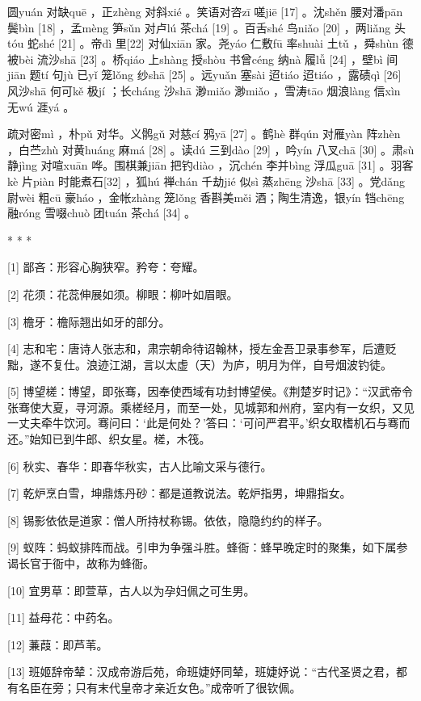 \documentclass[12pt,UTF8]{ctexbook}
\begin{document}
圆yuán 对缺quē ，正zhèng 对斜xié 。笑语对咨zī 嗟jiē [17] 。沈shěn 腰对潘pān 鬓bìn [18] ，孟mèng 笋sǔn 对卢lú 茶chá [19] 。百舌shé 鸟niǎo [20] ，两liǎng 头tóu 蛇shé [21] 。帝dì 里[22] 对仙xiān 家。尧yáo 仁敷fū 率shuài 土tǔ ，舜shùn 德被bèi 流沙shā [23] 。桥qiáo 上shàng 授shòu 书曾céng 纳nà 履lǚ [24] ，壁bì 间jiān 题tí 句jù 已yǐ 笼lǒng 纱shā [25] 。远yuǎn 塞sài 迢tiáo 迢tiáo ，露碛qì [26] 风沙shā 何可kě 极jí ；长cháng 沙shā 渺miǎo 渺miǎo ，雪涛tāo 烟浪làng 信xìn 无wú 涯yá 。

疏对密mì ，朴pǔ 对华。义鹘gǔ 对慈cí 鸦yā [27] 。鹤hè 群qún 对雁yàn 阵zhèn ，白苎zhù 对黄huáng 麻má [28] 。读dú 三到dào [29] ，吟yín 八叉chā [30] 。肃sù 静jìng 对喧xuān 哗。围棋兼jiān 把钓diào ，沉chén 李并bìng 浮瓜guā [31] 。羽客kè 片piàn 时能煮石[32] ，狐hú 禅chán 千劫jié 似sì 蒸zhēng 沙shā [33] 。党dǎng 尉wèi 粗cū 豪háo ，金帐zhàng 笼lǒng 香斟美měi 酒；陶生清逸，银yín 铛chēng 融róng 雪啜chuò 团tuán 茶chá [34] 。



* * *



[1] 鄙吝：形容心胸狭窄。矜夸：夸耀。

[2] 花须：花蕊伸展如须。柳眼：柳叶如眉眼。

[3] 檐牙：檐际翘出如牙的部分。

[4] 志和宅：唐诗人张志和，肃宗朝命待诏翰林，授左金吾卫录事参军，后遭贬黜，遂不复仕。浪迹江湖，言以太虚（天）为庐，明月为伴，自号烟波钓徒。

[5] 博望槎：博望，即张骞，因奉使西域有功封博望侯。《荆楚岁时记》：“汉武帝令张骞使大夏，寻河源。乘槎经月，而至一处，见城郭和州府，室内有一女织，又见一丈夫牵牛饮河。骞问曰：‘此是何处？’答曰：‘可问严君平。’织女取榰机石与骞而还。”始知已到牛郎、织女星。槎，木筏。

[6] 秋实、春华：即春华秋实，古人比喻文采与德行。

[7] 乾炉烹白雪，坤鼎炼丹砂：都是道教说法。乾炉指男，坤鼎指女。

[8] 锡影依依是道家：僧人所持杖称锡。依依，隐隐约约的样子。

[9] 蚁阵：蚂蚁排阵而战。引申为争强斗胜。蜂衙：蜂早晚定时的聚集，如下属参谒长官于衙中，故称为蜂衙。

[10] 宜男草：即萱草，古人以为孕妇佩之可生男。

[11] 益母花：中药名。

[12] 蒹葭：即芦苇。

[13] 班姬辞帝辇：汉成帝游后苑，命班婕妤同辇，班婕妤说：“古代圣贤之君，都有名臣在旁；只有末代皇帝才亲近女色。”成帝听了很钦佩。
\end{document}
